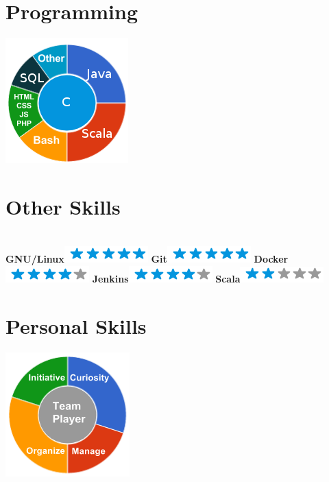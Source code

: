\documentclass[]{friggeri-cv}
\begin{document}
\begin{aside}
  \section{Programming}
    \includegraphics[scale=0.55]{img/programming.png}
    ~
  \section{Other Skills}
    \textbf{\\GNU/Linux}\includegraphics[scale=0.40]{img/5stars.png}
    \textbf{Git}\includegraphics[scale=0.40]{img/5stars.png}
    \textbf{Docker}\includegraphics[scale=0.40]{img/4stars.png}
    \textbf{Jenkins}\includegraphics[scale=0.40]{img/4stars.png}
    \textbf{Scala}\includegraphics[scale=0.40]{img/2stars.png}
    ~
  \section{Personal Skills}
    \includegraphics[scale=0.55]{img/personal.png}
    ~
\end{aside}
\end{document}
